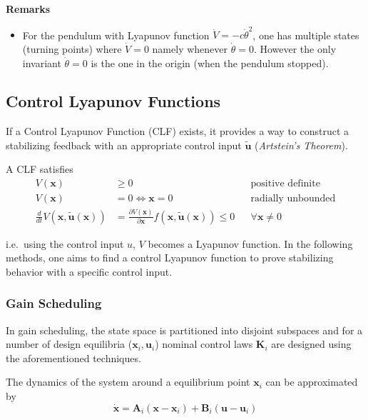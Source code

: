 \newpar{}
\textbf{Remarks}
\begin{itemize}
    \item For the pendulum with Lyapunov function $\dot{V}=-c\dot{\theta}^2$, one has multiple states (turning points) where $\dot{V}=0$ namely whenever $\dot{\theta}=0$. However the only invariant $\dot{\theta}=0$ is the one in the origin (when the pendulum stopped).
\end{itemize}



\subsection{Control Lyapunov Functions}
If a Control Lyapunov Function (CLF) exists, it provides a way to construct a stabilizing feedback with an appropriate control input $\tilde{\mathbf{u}}$ (\textit{Artstein's Theorem}).

\newpar{}
A CLF satisfies
\noindent\begin{align*}
    V(\mathbf{x})                                              & \geq 0                                                                                           &  & \text{positive definite}  \\
    V(\mathbf{x})                                              & = 0 \Leftrightarrow \mathbf{x} = 0                                                               &  & \text{radially unbounded} \\
    \frac{d}{dt} V(\mathbf{x}, \tilde{\mathbf{u}}(\mathbf{x})) & = \frac{\partial V(\mathbf{x})}{\partial \mathbf{x}} f(\mathbf{x}, \tilde{\mathbf{u}}(\mathbf{x})) \leq 0 &  & \forall \mathbf{x}\neq 0
\end{align*}

i.e.\ using the control input $u$, $V$ becomes a Lyapunov function. In the following methods, one aims to find a control Lyapunov function to prove stabilizing behavior with a specific control input.

\subsubsection{Gain Scheduling}
In gain scheduling, the state space is partitioned into disjoint subspaces and for a number of design equilibria ($\mathbf{x}_i, \mathbf{u}_i$)  nominal control laws $\mathbf{K}_i$ are designed using the aforementioned techniques.

\newpar{}
The dynamics of the system around a equilibrium point $\mathbf{x}_i$ can be approximated by
\noindent\begin{equation*}
    \dot{\mathbf{x}} = \mathbf{A}_i(\mathbf{x}-\mathbf{x}_i) + \mathbf{B}_i(\mathbf{u}-\mathbf{u}_i)
\end{equation*}

